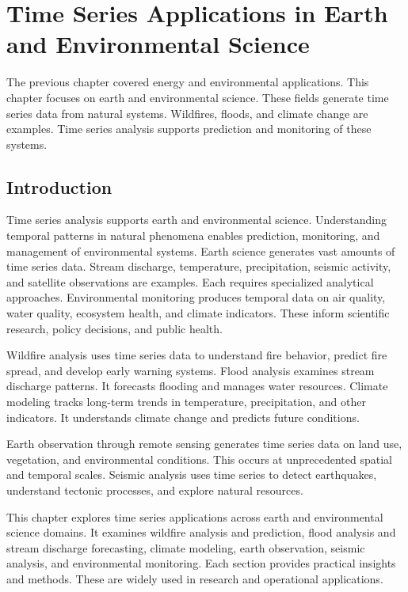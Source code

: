 \chapter{Time Series Applications in Earth and Environmental Science}

The previous chapter covered energy and environmental applications. This chapter focuses on earth and environmental science. These fields generate time series data from natural systems. Wildfires, floods, and climate change are examples. Time series analysis supports prediction and monitoring of these systems.

\section{Introduction}

Time series analysis supports earth and environmental science. Understanding temporal patterns in natural phenomena enables prediction, monitoring, and management of environmental systems. Earth science generates vast amounts of time series data. Stream discharge, temperature, precipitation, seismic activity, and satellite observations are examples. Each requires specialized analytical approaches. Environmental monitoring produces temporal data on air quality, water quality, ecosystem health, and climate indicators. These inform scientific research, policy decisions, and public health.

Wildfire analysis uses time series data to understand fire behavior, predict fire spread, and develop early warning systems. Flood analysis examines stream discharge patterns. It forecasts flooding and manages water resources. Climate modeling tracks long-term trends in temperature, precipitation, and other indicators. It understands climate change and predicts future conditions.

Earth observation through remote sensing generates time series data on land use, vegetation, and environmental conditions. This occurs at unprecedented spatial and temporal scales. Seismic analysis uses time series to detect earthquakes, understand tectonic processes, and explore natural resources.

This chapter explores time series applications across earth and environmental science domains. It examines wildfire analysis and prediction, flood analysis and stream discharge forecasting, climate modeling, earth observation, seismic analysis, and environmental monitoring. Each section provides practical insights and methods. These are widely used in research and operational applications.

